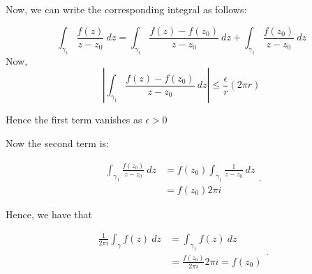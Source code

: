 \documentclass{article}
\begin{document}
\begin{flushleft}
	Now, we can write the corresponding integral as follows:

	\begin{equation*}
	\int_{{\gamma_1}}^{{}} {\frac{f\left( z \right) }{z-z_0}} \: d{z} {}  = \int_{{\gamma_1}}^{{}} {\frac{f\left( z \right) - f\left( z_0 \right)  }{z-z_0}} \: d{z} {} + \int_{{\gamma_1}}^{{}} {\frac{f\left( z_0 \right) }{z-z_0}} \: d{z} {} 
    \end{equation*}
	Now, 
	\begin{equation*}
		|\int_{{\gamma_1}}^{{}} {\frac{f\left( z \right) - f\left( z_0 \right)  }{z-z_0}} \: d{z} {}| \le  \frac{\epsilon}{r}  (2 \pi r)  
    \end{equation*}

	Hence the first term vanishes as $\epsilon>0$ 

	Now the second term is:

	\[
	\begin{split}
		\int_{{\gamma_1}}^{{}} {\frac{f\left( z_0 \right) }{z-z_0}} \: d{z} {}  &= f\left( z_0 \right) \int_{{\gamma_1}}^{{}} {\frac{1}{z-z_0}} \: d{z} {} \\							&= f\left( z_0 \right) 2 \pi i 
	\end{split}
	.\] 

	Hence, we have that 

	
	\[
	\begin{split}
		\frac{1}{2 \pi i}\int_{{\gamma}}^{{}} {f\left( z \right) } \: d{z} {} &= \int_{{\gamma_1}}^{{}} {f\left( z \right) } \: d{z} {} \\ 
										      &=  \frac{f \left( z_0 \right)}{2 \pi i} 2 \pi i = f\left( z_0 \right)  \\
	\end{split}
	.\] 


\end{flushleft}
\end{document}
